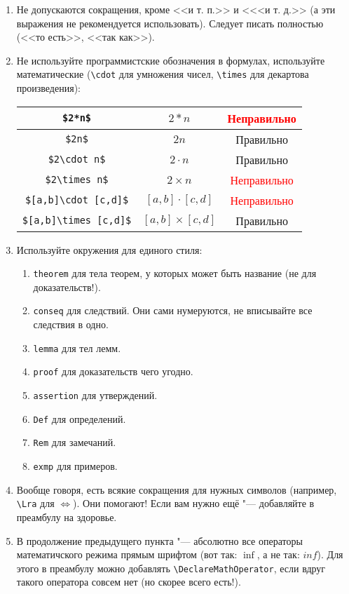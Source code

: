 \documentclass[12pt,a4paper]{book}
\def\Lra{\Leftrightarrow}
\newcounter{theorem}[section]
\newcounter{conseq}[theorem]
\newcommand{\ok}{& \textcolor{green!60!black}{Правильно}}
\newcommand{\bad}{& \textcolor{red}{Неправильно}}
\begin{document}
\begin{enumerate}
\item Не допускаются сокращения, кроме <<и т. п.>> и <<<и т. д.>> (а эти выражения не рекомендуется использовать). Следует писать полностью (<<то есть>>, <<так как>>).
\item Не используйте программистские обозначения в формулах, используйте математические (\verb!\cdot! для умножения чисел,
\verb!\times! для декартова произведения):
\begin{center}\begin{tabular}{|c|c|c|}
\hline \verb!$2*n$! & $2*n$ \bad \\
\hline \verb!$2n$! & $2n$ \ok \\
\hline \verb!$2\cdot n$! & $2\cdot n$ \ok \\
\hline \verb!$2\times n$! & $2\times n$ \bad \\
\hline \verb!$[a,b]\cdot [c,d]$! & $[a,b]\cdot [c,d]$ \bad \\
\hline \verb!$[a,b]\times [c,d]$! & $[a,b]\times [c,d]$ \ok \\
\hline
\end{tabular}\end{center}
\item Используйте окружения для единого стиля:
\begin{enumerate}
\item \verb'theorem' для тела теорем, у которых может быть название (не для доказательств!).
\item \verb'conseq' для следствий. Они сами нумеруются, не вписывайте все следствия в одно.
\item \verb'lemma' для тел лемм.
\item \verb'proof' для доказательств чего угодно.
\item \verb'assertion' для утверждений.
\item \verb'Def' для определений.
\item \verb'Rem' для замечаний.
\item \verb'exmp' для примеров.
\end{enumerate}
\item Вообще говоря, есть всякие сокращения для нужных символов (например, \verb'\Lra' для $\Lra$). Они помогают! Если вам нужно ещё "--- добавляйте в преамбулу на здоровье.
\item В продолжение предыдущего пункта "--- абсолютно все операторы математичского режима прямым шрифтом (вот так: $\inf$, а не так: $inf$). Для этого в преамбулу можно добавлять \verb'\DeclareMathOperator', если вдруг такого оператора совсем нет (но скорее всего есть!).

\end{enumerate}
\end{document}

